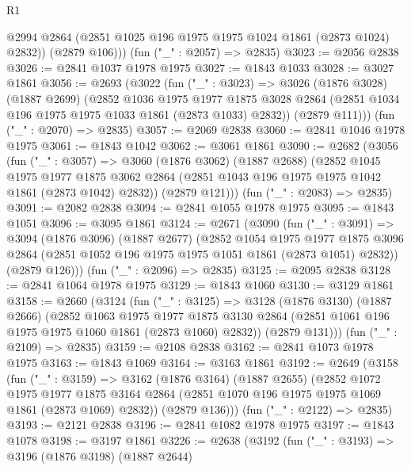 \begin{lexlean}{R1}
\begin{coremodule}
          @2994
          @2864
          (@2851 @1025 @196 @1975 @1975 @1024 @1861 (@2873 @1024) @2832))
        (@2879 @106)))
    (fun ("_" : @2057) => @2835)
@3023 := @2056 @2838
@3026 := @2841 @1037 @1978 @1975
@3027 := @1843 @1033
@3028 := @3027 @1861
@3056 := @2693
    (@3022
      (fun ("_" : @3023) =>
      @3026
        (@1876 @3028)
        (@1887 @2699)
        (@2852
          @1036
          @1975
          @1977
          @1875
          @3028
          @2864
          (@2851 @1034 @196 @1975 @1975 @1033 @1861 (@2873 @1033) @2832))
        (@2879 @111)))
    (fun ("_" : @2070) => @2835)
@3057 := @2069 @2838
@3060 := @2841 @1046 @1978 @1975
@3061 := @1843 @1042
@3062 := @3061 @1861
@3090 := @2682
    (@3056
      (fun ("_" : @3057) =>
      @3060
        (@1876 @3062)
        (@1887 @2688)
        (@2852
          @1045
          @1975
          @1977
          @1875
          @3062
          @2864
          (@2851 @1043 @196 @1975 @1975 @1042 @1861 (@2873 @1042) @2832))
        (@2879 @121)))
    (fun ("_" : @2083) => @2835)
@3091 := @2082 @2838
@3094 := @2841 @1055 @1978 @1975
@3095 := @1843 @1051
@3096 := @3095 @1861
@3124 := @2671
    (@3090
      (fun ("_" : @3091) =>
      @3094
        (@1876 @3096)
        (@1887 @2677)
        (@2852
          @1054
          @1975
          @1977
          @1875
          @3096
          @2864
          (@2851 @1052 @196 @1975 @1975 @1051 @1861 (@2873 @1051) @2832))
        (@2879 @126)))
    (fun ("_" : @2096) => @2835)
@3125 := @2095 @2838
@3128 := @2841 @1064 @1978 @1975
@3129 := @1843 @1060
@3130 := @3129 @1861
@3158 := @2660
    (@3124
      (fun ("_" : @3125) =>
      @3128
        (@1876 @3130)
        (@1887 @2666)
        (@2852
          @1063
          @1975
          @1977
          @1875
          @3130
          @2864
          (@2851 @1061 @196 @1975 @1975 @1060 @1861 (@2873 @1060) @2832))
        (@2879 @131)))
    (fun ("_" : @2109) => @2835)
@3159 := @2108 @2838
@3162 := @2841 @1073 @1978 @1975
@3163 := @1843 @1069
@3164 := @3163 @1861
@3192 := @2649
    (@3158
      (fun ("_" : @3159) =>
      @3162
        (@1876 @3164)
        (@1887 @2655)
        (@2852
          @1072
          @1975
          @1977
          @1875
          @3164
          @2864
          (@2851 @1070 @196 @1975 @1975 @1069 @1861 (@2873 @1069) @2832))
        (@2879 @136)))
    (fun ("_" : @2122) => @2835)
@3193 := @2121 @2838
@3196 := @2841 @1082 @1978 @1975
@3197 := @1843 @1078
@3198 := @3197 @1861
@3226 := @2638
    (@3192
      (fun ("_" : @3193) =>
      @3196
        (@1876 @3198)
        (@1887 @2644)

\end{coremodule}
\end{lexlean}
